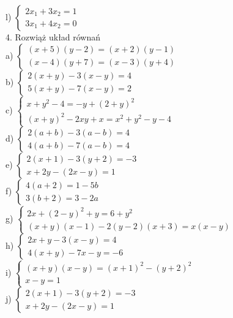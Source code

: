 \documentclass[10pt]{article}
\begin{document}
l) \(\left\{\begin{array}{l}2 x_{1}+3 x_{2}=1 \\ 3 x_{1}+4 x_{2}=0\end{array}\right.\)\\
4. Rozwiąż układ równań\\
a) \(\left\{\begin{array}{l}(x+5)(y-2)=(x+2)(y-1) \\ (x-4)(y+7)=(x-3)(y+4)\end{array}\right.\)\\
b) \(\left\{\begin{array}{l}2(x+y)-3(x-y)=4 \\ 5(x+y)-7(x-y)=2\end{array}\right.\)\\
c) \(\left\{\begin{array}{l}x+y^{2}-4=-y+(2+y)^{2} \\ (x+y)^{2}-2 x y+x=x^{2}+y^{2}-y-4\end{array}\right.\)\\
d) \(\left\{\begin{array}{l}2(a+b)-3(a-b)=4 \\ 4(a+b)-7(a-b)=4\end{array}\right.\)\\
e) \(\left\{\begin{array}{l}2(x+1)-3(y+2)=-3 \\ x+2 y-(2 x-y)=1\end{array}\right.\)\\
f) \(\left\{\begin{array}{l}4(a+2)=1-5 b \\ 3(b+2)=3-2 a\end{array}\right.\)\\
g) \(\left\{\begin{array}{l}2 x+(2-y)^{2}+y=6+y^{2} \\ (x+y)(x-1)-2(y-2)(x+3)=x(x-y)\end{array}\right.\)\\
h) \(\left\{\begin{array}{l}2 x+y-3(x-y)=4 \\ 4(x+y)-7 x-y=-6\end{array}\right.\)\\
i) \(\left\{\begin{array}{l}(x+y)(x-y)=(x+1)^{2}-(y+2)^{2} \\ x-y=1\end{array}\right.\)\\
j) \(\left\{\begin{array}{l}2(x+1)-3(y+2)=-3 \\ x+2 y-(2 x-y)=1\end{array}\right.\)
\end{document}
